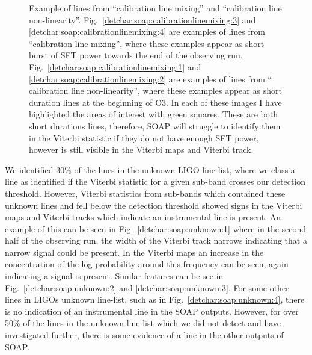 \begin{figure}[hpt]
\begin{subfigure}[h]{0.49\textwidth}
\end{subfigure}
	\caption[Example of lines from ``calibration line mixing'' and ``calibration line non-linearity''.]{Example of lines from ``calibration line mixing'' and ``calibration line non-linearity''. Fig.~\ref{detchar:soap:calibrationlinemixing:3} and \ref{detchar:soap:calibrationlinemixing:4}  are examples of lines from ``calibration line mixing'', where these examples appear as short burst of \gls{SFT} power towards the end of the observing run. Fig.~\ref{detchar:soap:calibrationlinemixing:1} and \ref{detchar:soap:calibrationlinemixing:2} are examples of lines from `` calibration line non-linearity'', where these examples appear as short duration lines at the beginning of O3.  In each of these images I have highlighted the areas of interest with green squares. These are both short durations lines, therefore, SOAP will struggle to identify them in the Viterbi statistic if they do not have enough \gls{SFT} power, however is still visible in the Viterbi maps and Viterbi track.}
	\label{detchar:soap:calibrationlinemixing}
\end{figure}
%

We identified 30\% of the lines in the unknown \gls{LIGO} line-list, where we class a line as identified if the Viterbi
statistic for a given sub-band crosses our detection threshold.  However, Viterbi statistics
from sub-bands which contained these unknown lines and fell below the detection
threshold showed signs in the Viterbi maps and Viterbi tracks which indicate an
instrumental line is present. An example of this can be seen in
Fig.~\ref{detchar:soap:unknown:1} where in the second half of the observing
run, the width of the Viterbi track narrows indicating that a narrow signal
could be present. In the Viterbi maps an increase in the concentration of the
log-probability around this frequency can be seen, again indicating a signal is
present. Similar features can be see in Fig.~\ref{detchar:soap:unknown:2} and
\ref{detchar:soap:unknown:3}.  For some other lines in \glspl{LIGO} unknown
line-list, such as in Fig.~\ref{detchar:soap:unknown:4}, there is no indication
of an instrumental line in the SOAP outputs. However, for over 50\% of the lines in the unknown line-list which we did not detect and have investigated further, there is some evidence of a line in the other outputs of SOAP. 

